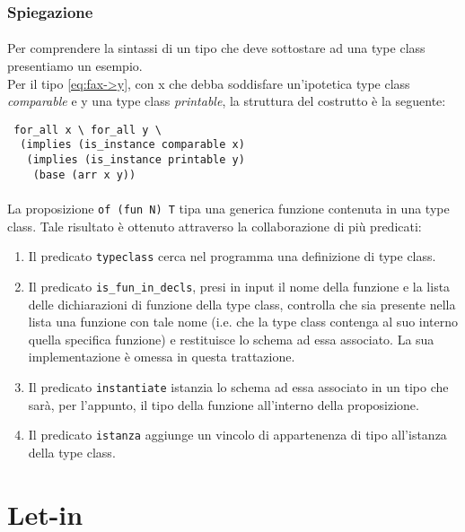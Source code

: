 \documentclass[12pt,a4paper,openright,twoside]{report}
\begin{document}
\subsubsection{Spiegazione}

\paragraph{}
Per comprendere la sintassi di un tipo che deve sottostare ad una type class presentiamo un esempio.\\
Per il tipo \eqref{eq:fax->y}, con x che debba soddisfare un'ipotetica type class \textit{comparable} e y una type class \textit{printable}, la struttura del costrutto è la seguente:
\begin{verbatim}
 for_all x \ for_all y \
  (implies (is_instance comparable x)
   (implies (is_instance printable y)
    (base (arr x y))
\end{verbatim}

\paragraph{}
La proposizione \verb"of (fun N) T" tipa una generica funzione contenuta in una type class. Tale risultato è ottenuto attraverso la collaborazione di più predicati:
\begin{enumerate}
 \item Il predicato \verb"typeclass" cerca nel programma una definizione di type class.
 \item Il predicato \verb"is_fun_in_decls", presi in input il nome della funzione e la lista delle dichiarazioni di funzione della type class, controlla che sia presente nella lista una funzione con tale nome (i.e. che la type class contenga al suo interno quella specifica funzione) e restituisce lo schema ad essa associato. La sua implementazione è omessa in questa trattazione.
 \item Il predicato \verb"instantiate" istanzia lo schema ad essa associato in un tipo che sarà, per l'appunto, il tipo della funzione all'interno della proposizione.
 \item Il predicato \verb"istanza" aggiunge un vincolo di appartenenza di tipo all'istanza della type class.
\end{enumerate}

\section{Let-in}
\end{document}
